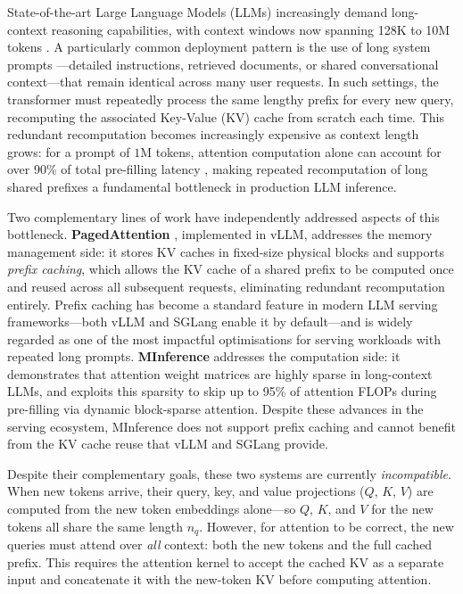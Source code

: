\documentclass{article}
\begin{document}
State-of-the-art Large Language Models (LLMs) increasingly demand
long-context reasoning capabilities, with context windows now spanning 128K
to 10M tokens \cite{minference, geminiteam2024gemini15unlockingmultimodal}.
A particularly common deployment pattern is the use of long system
prompts \cite{zheng2024sglang}---detailed instructions, retrieved documents,
or shared conversational context---that remain identical across many user
requests. In such settings, the transformer must repeatedly process the same
lengthy prefix for every new query, recomputing the associated Key-Value (KV)
cache from scratch each time. This redundant recomputation becomes
increasingly expensive as context length grows: for a prompt of $1\text{M}$
tokens, attention computation alone can account for over 90\% of total
pre-filling latency \cite{minference}, making repeated recomputation of long
shared prefixes a fundamental bottleneck in production LLM inference.

Two complementary lines of work have independently addressed aspects of this
bottleneck. \textbf{PagedAttention} \cite{pagedattention}, implemented in
vLLM, addresses the memory management side: it stores KV caches in
fixed-size physical blocks and supports \textit{prefix caching}, which
allows the KV cache of a shared prefix to be computed once and reused
across all subsequent requests, eliminating redundant recomputation
entirely. Prefix caching has become a standard feature in modern LLM
serving frameworks---both vLLM \cite{pagedattention} and SGLang
\cite{zheng2024sglang} enable it by default---and is widely regarded as
one of the most impactful optimisations for serving workloads with repeated
long prompts. \textbf{MInference} \cite{minference} addresses the computation
side: it demonstrates that attention weight matrices are highly sparse in
long-context LLMs, and exploits this sparsity to skip up to 95\% of
attention FLOPs during pre-filling via dynamic block-sparse attention.
Despite these advances in the serving ecosystem, MInference does not
support prefix caching and cannot benefit from the KV cache reuse that
vLLM \cite{pagedattention} and SGLang \cite{zheng2024sglang} provide.

Despite their complementary goals, these two systems are currently
\textit{incompatible}. When new tokens arrive, their query, key, and value
projections ($Q$, $K$, $V$) are computed from the new token embeddings
alone---so $Q$, $K$, and $V$ for the new tokens all share the same length
$n_q$. However, for attention to be correct, the new queries must attend
over \textit{all} context: both the new tokens and the full cached prefix.
This requires the attention kernel to accept the cached KV as a separate
input and concatenate it with the new-token KV before computing attention.
\end{document}
